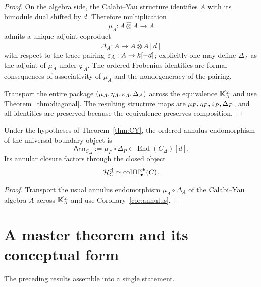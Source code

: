 \begin{proof}
On the algebra side, the Calabi--Yau structure identifies $A$ with its bimodule dual shifted by
$d$. Therefore multiplication
\[
\mu_A:A\widehat\otimes A\to A
\]
admits a unique adjoint coproduct
\[
\Delta_A:A\to A\widehat\otimes A[d]
\]
with respect to the trace pairing $\varepsilon_A:A\to k[-d]$; explicitly one may define $\Delta_A$ as the
adjoint of $\mu_A$ under $\varphi_A$. The ordered Frobenius identities are formal consequences of
associativity of $\mu_A$ and the nondegeneracy of the pairing.

Transport the entire package $(\mu_A,\eta_A,\varepsilon_A,\Delta_A)$ across the equivalence
$\mathbb{K}_A^{\mathrm{bi}}$ and use Theorem~\ref{thm:diagonal}. The resulting structure maps are
$\mu_P,\eta_P,\varepsilon_P,\Delta_P$, and all identities are preserved because the equivalence preserves
composition.
\end{proof}

\begin{corollary}
\ClaimStatusProvedHere
\label{cor:cardy}
Under the hypotheses of Theorem~\ref{thm:CY}, the ordered annulus endomorphism of the universal
boundary object is
\[
\mathsf{Ann}_{C_\Delta}:=\mu_P\circ \Delta_P\in \operatorname{End}(C_\Delta)[d].
\]
Its annular closure factors through the closed object
\[
\mathcal H_C^{\mathrm{cl}}\simeq \operatorname{coHH}^{\mathrm{ch}}_\bullet(C).
\]
\end{corollary}

\begin{proof}
Transport the usual annulus endomorphism $\mu_A\circ \Delta_A$ of the Calabi--Yau algebra $A$ across
$\mathbb{K}_A^{\mathrm{bi}}$ and use Corollary~\ref{cor:annulus}.
\end{proof}

\section{A master theorem and its conceptual form}
\label{sec:master}

The preceding results assemble into a single statement.

